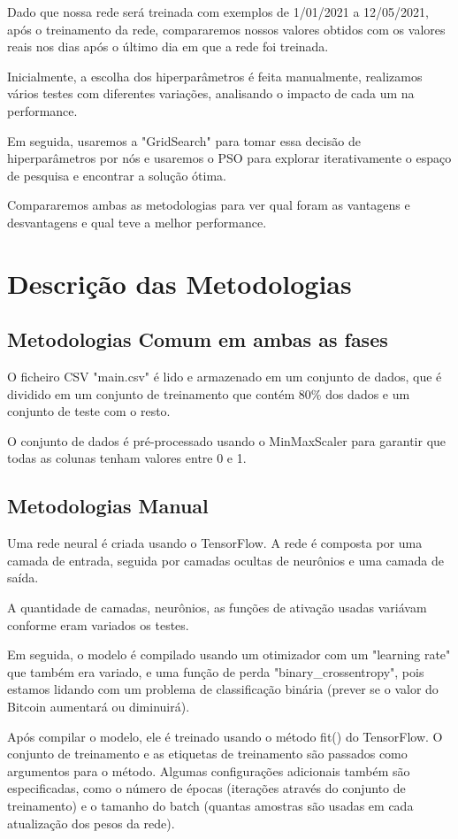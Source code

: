\documentclass[10pt]{article}
\begin{document}
Dado que nossa rede será treinada com exemplos de 1/01/2021 a 12/05/2021, 
após o treinamento da rede, compararemos nossos valores obtidos 
com os valores reais nos dias após o último dia em que a rede foi treinada. 

Inicialmente, a escolha dos hiperparâmetros é feita manualmente, realizamos 
vários testes com diferentes variações, analisando o impacto de cada um 
na performance. 

Em seguida, usaremos a "GridSearch" para tomar essa decisão de 
hiperparâmetros por nós e usaremos o PSO para explorar iterativamente 
o espaço de pesquisa e encontrar a solução ótima. 

Compararemos ambas as metodologias para ver qual foram as vantagens 
e desvantagens e qual teve a melhor performance.

\section{Descrição das Metodologias}\label{sec:desc-das-met}
\subsection{Metodologias Comum em ambas as fases}

O ficheiro CSV "main.csv" é lido e armazenado em um conjunto de dados, 
que é dividido em um conjunto de treinamento que contém 80\% dos dados
e um conjunto de teste com o resto.

O conjunto de dados é pré-processado usando o MinMaxScaler 
para garantir que todas as colunas tenham valores entre 0 e 1.

\subsection{Metodologias Manual}

Uma rede neural é criada usando o TensorFlow. 
A rede é composta por uma camada de entrada, 
seguida por camadas ocultas de neurônios e uma camada de saída.

A quantidade de camadas, neurônios, as funções de ativação usadas variávam
conforme eram variados os testes.

Em seguida, o modelo é compilado usando um otimizador com um "learning rate"
que também era variado, e uma função de perda "binary\_crossentropy",
pois estamos lidando com um problema de classificação binária 
(prever se o valor do Bitcoin aumentará ou diminuirá).

Após compilar o modelo, ele é treinado usando o método fit() do TensorFlow. 
O conjunto de treinamento e as etiquetas de treinamento 
são passados como argumentos para o método. Algumas configurações adicionais 
também são especificadas, como o número de épocas 
(iterações através do conjunto de treinamento) e o tamanho do batch 
(quantas amostras são usadas em cada atualização dos pesos da rede).
\end{document}
